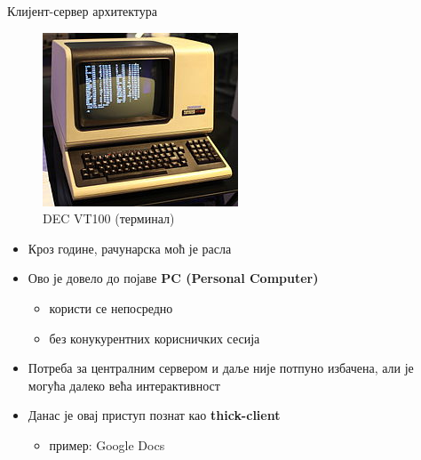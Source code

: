 \documentclass[aspectratio=169]{beamer}
\begin{document}
\begin{frame}[allowframebreaks]{Клијент-сервер архитектура}
        \begin{figure}
            \centering
            \includegraphics[width=\textwidth,height=0.55\textheight,keepaspectratio]{images/DEC_VT100_terminal.jpg}
            \caption{DEC VT100 (терминал)}
            \label{fig:terminal}
        \end{figure}
        
        \framebreak
        
        \begin{itemize}
            \item Кроз године, рачунарска моћ је расла
            \item Ово је довело до појаве \textbf{PC (Personal Computer)}
            \begin{itemize}
                \item користи се непосредно
                \item без конукурентних корисничких сесија
            \end{itemize}
            \item Потреба за централним сервером и даље није потпуно избачена, али је могућа далеко већа интерактивност
            \item Данас је овај приступ познат као \textbf{thick-client}
            \begin{itemize}
                \item пример: Google Docs
            \end{itemize}
        \end{itemize}
    \end{frame}
    
\end{document}
